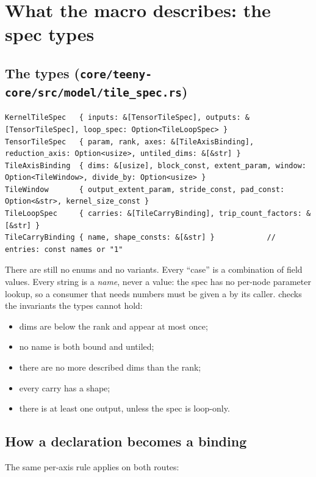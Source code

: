 \section{What the macro describes: the spec types}
\label{sec:spec}

\subsection{The types (\texttt{core/teeny-core/src/model/tile\_spec.rs})}

\begin{lstlisting}
KernelTileSpec   { inputs: &[TensorTileSpec], outputs: &[TensorTileSpec], loop_spec: Option<TileLoopSpec> }
TensorTileSpec   { param, rank, axes: &[TileAxisBinding], reduction_axis: Option<usize>, untiled_dims: &[&str] }
TileAxisBinding  { dims: &[usize], block_const, extent_param, window: Option<TileWindow>, divide_by: Option<usize> }
TileWindow       { output_extent_param, stride_const, pad_const: Option<&str>, kernel_size_const }
TileLoopSpec     { carries: &[TileCarryBinding], trip_count_factors: &[&str] }
TileCarryBinding { name, shape_consts: &[&str] }            // entries: const names or "1"
\end{lstlisting}

There are still no enums and no variants. Every ``case'' is a combination of field
values. Every string is a \emph{name}, never a value: the spec has no per-node
parameter lookup, so a consumer that needs numbers must be given a
 by its caller.  checks the
invariants the types cannot hold:
\begin{itemize}
\item dims are below the rank and appear at most once;
\item no name is both bound and untiled;
\item there are no more described dims than the rank;
\item every carry has a shape;
\item there is at least one output, unless the spec is loop-only.
\end{itemize}

\subsection{How a declaration becomes a binding}

The same per-axis rule applies on both routes:

